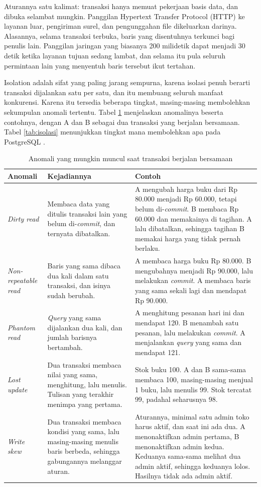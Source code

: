 Aturannya satu kalimat: transaksi hanya memuat pekerjaan basis data, dan
dibuka selambat mungkin. Panggilan Hypertext Transfer Protocol (HTTP) ke
layanan luar, pengiriman surel, dan pengunggahan file dikeluarkan darinya.
Alasannya, selama transaksi terbuka, baris yang disentuhnya terkunci bagi
penulis lain. Panggilan jaringan yang biasanya 200 milidetik dapat menjadi 30
detik ketika layanan tujuan sedang lambat, dan selama itu pula seluruh
permintaan lain yang menyentuh baris tersebut ikut tertahan.

Isolation adalah sifat yang paling jarang sempurna, karena isolasi penuh
berarti transaksi dijalankan satu per satu, dan itu membuang seluruh manfaat
konkurensi. Karena itu tersedia beberapa tingkat, masing-masing membolehkan
sekumpulan anomali tertentu. Tabel \ref{tab:anomali} menjelaskan anomalinya
beserta contohnya, dengan A dan B sebagai dua transaksi yang berjalan
bersamaan. Tabel \ref{tab:isolasi} menunjukkan tingkat mana membolehkan apa
pada PostgreSQL \cite{pgdoc-mvcc}.

\begin{table}[!htb]
  \centering
  \caption{Anomali yang mungkin muncul saat transaksi berjalan bersamaan}
  \label{tab:anomali}
  \begin{tabularx}{\textwidth}{lXX}
    \hline
    \textbf{Anomali} & \textbf{Kejadiannya} & \textbf{Contoh} \\
    \hline
    \textit{Dirty read} & Membaca data yang ditulis transaksi lain yang belum di-\textit{commit}, dan ternyata dibatalkan. & A mengubah harga buku dari Rp 80.000 menjadi Rp 60.000, tetapi belum di-\textit{commit}. B membaca Rp 60.000 dan memakainya di tagihan. A lalu dibatalkan, sehingga tagihan B memakai harga yang tidak pernah berlaku. \\
    \hline
    \textit{Non-repeatable read} & Baris yang sama dibaca dua kali dalam satu transaksi, dan isinya sudah berubah. & A membaca harga buku Rp 80.000. B mengubahnya menjadi Rp 90.000, lalu melakukan \textit{commit}. A membaca baris yang sama sekali lagi dan mendapat Rp 90.000. \\
    \hline
    \textit{Phantom read} & \textit{Query} yang sama dijalankan dua kali, dan jumlah barisnya bertambah. & A menghitung pesanan hari ini dan mendapat 120. B menambah satu pesanan, lalu melakukan \textit{commit}. A menjalankan \textit{query} yang sama dan mendapat 121. \\
    \hline
    \textit{Lost update} & Dua transaksi membaca nilai yang sama, menghitung, lalu menulis. Tulisan yang terakhir menimpa yang pertama. & Stok buku 100. A dan B sama-sama membaca 100, masing-masing menjual 1 buku, lalu menulis 99. Stok tercatat 99, padahal seharusnya 98. \\
    \hline
    \textit{Write skew} & Dua transaksi membaca kondisi yang sama, lalu masing-masing menulis baris berbeda, sehingga gabungannya melanggar aturan. & Aturannya, minimal satu admin toko harus aktif, dan saat ini ada dua. A menonaktifkan admin pertama, B menonaktifkan admin kedua. Keduanya sama-sama melihat dua admin aktif, sehingga keduanya lolos. Hasilnya tidak ada admin aktif. \\
    \hline
  \end{tabularx}
\end{table}


